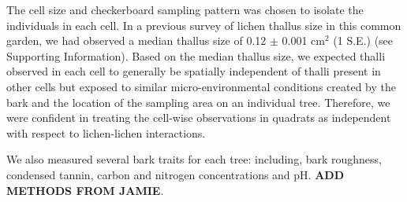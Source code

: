 \documentclass[11pt,twocolumn,twoside,lineno]{pnas-new}
\begin{document}
{The cell size and checkerboard sampling pattern was chosen to isolate
the individuals in each cell. In a previous survey of lichen thallus
size in this common garden, we had observed a median thallus size of
0.12 $\pm$ 0.001 cm$^2$ (1 S.E.) (see Supporting Information). Based
on the median thallus size, we expected thalli observed in each cell
to generally be spatially independent of thalli present in other cells
but exposed to similar micro-environmental conditions created by the
bark and the location of the sampling area on an individual
tree. Therefore, we were confident in treating the cell-wise
observations in quadrats as independent with respect to lichen-lichen
interactions.



We also measured several bark traits for each tree: including, bark
roughness, condensed tannin, carbon and nitrogen concentrations and
pH. \textbf{ADD METHODS FROM JAMIE}.


}
\end{document}
